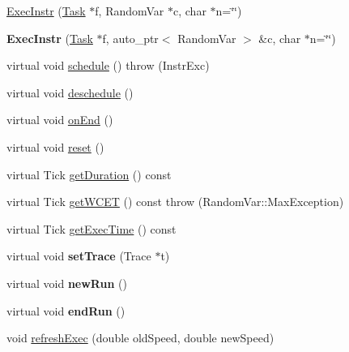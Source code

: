 \begin{DoxyCompactItemize}
\item 
\hyperlink{classRTSim_1_1ExecInstr_a1a40a2a8a6378c47846de4535bb3501a}{Exec\+Instr} (\hyperlink{classRTSim_1_1Task}{Task} $\ast$f, Random\+Var $\ast$c, char $\ast$n=\char`\"{}\char`\"{})
\item 
{\bfseries Exec\+Instr} (\hyperlink{classRTSim_1_1Task}{Task} $\ast$f, auto\+\_\+ptr$<$ Random\+Var $>$ \&c, char $\ast$n=\char`\"{}\char`\"{})\hypertarget{classRTSim_1_1ExecInstr_a116fb98a6d2657eb6b83018b3c08be81}{}\label{classRTSim_1_1ExecInstr_a116fb98a6d2657eb6b83018b3c08be81}

\item 
virtual void \hyperlink{classRTSim_1_1ExecInstr_ac3ee1947f5bc6d19f0283b6fc8881dae}{schedule} ()  throw (\+Instr\+Exc)
\item 
virtual void \hyperlink{classRTSim_1_1ExecInstr_a1de7df8b33227e842077f59f0541f5aa}{deschedule} ()
\item 
virtual void \hyperlink{classRTSim_1_1ExecInstr_a527f08d8c27a75dda7bb7a1b532772be}{on\+End} ()
\item 
virtual void \hyperlink{classRTSim_1_1ExecInstr_ac4ac02cd84200d9c2195eab52a12805e}{reset} ()
\item 
virtual Tick \hyperlink{classRTSim_1_1ExecInstr_af2e21e2e455d82aeea048c275979effc}{get\+Duration} () const 
\item 
virtual Tick \hyperlink{classRTSim_1_1ExecInstr_a9a78eccb58f69adc2443223b35f3f8f1}{get\+W\+C\+ET} () const   throw (\+Random\+Var\+::\+Max\+Exception)
\item 
virtual Tick \hyperlink{classRTSim_1_1ExecInstr_a6c72932483ca3664ea3ed8350abb82d1}{get\+Exec\+Time} () const 
\item 
virtual void {\bfseries set\+Trace} (Trace $\ast$t)\hypertarget{classRTSim_1_1ExecInstr_a629f1cb13e79890d2f6f5398b516a0fd}{}\label{classRTSim_1_1ExecInstr_a629f1cb13e79890d2f6f5398b516a0fd}

\item 
virtual void {\bfseries new\+Run} ()\hypertarget{classRTSim_1_1ExecInstr_adb88c181407801963d33778a23556037}{}\label{classRTSim_1_1ExecInstr_adb88c181407801963d33778a23556037}

\item 
virtual void {\bfseries end\+Run} ()\hypertarget{classRTSim_1_1ExecInstr_ae7c910f19ab0d3e2b8977504a0473db9}{}\label{classRTSim_1_1ExecInstr_ae7c910f19ab0d3e2b8977504a0473db9}

\item 
void \hyperlink{classRTSim_1_1ExecInstr_af927f330d66689797c2c53bda31e3f63}{refresh\+Exec} (double old\+Speed, double new\+Speed)
\end{DoxyCompactItemize}
